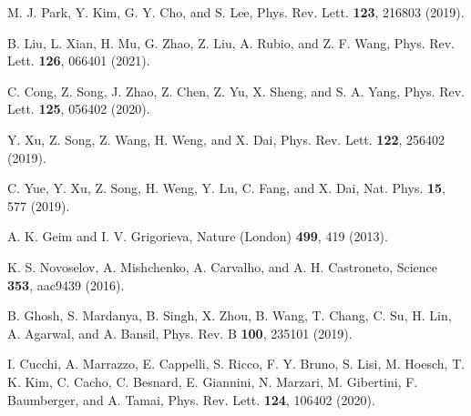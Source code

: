 \documentclass[aps,prl,twocolumn,showpacs,superscriptaddress]{revtex4-1}
\begin{document}
\begin{thebibliography}{99}
M. J. Park, Y. Kim, G. Y. Cho, and S. Lee, Phys. Rev. Lett. \textbf{123}, 216803 (2019).

B. Liu, L. Xian, H. Mu, G. Zhao, Z. Liu, A. Rubio, and Z. F. Wang, Phys. Rev. Lett. \textbf{126}, 066401 (2021).

C. Cong, Z. Song, J. Zhao, Z. Chen, Z. Yu, X. Sheng, and S. A. Yang, Phys. Rev. Lett. \textbf{125}, 056402 (2020).

Y. Xu, Z. Song, Z. Wang, H. Weng, and X. Dai, Phys. Rev. Lett. \textbf{122}, 256402 (2019).

C. Yue, Y. Xu, Z. Song, H. Weng, Y. Lu, C. Fang, and X. Dai, Nat. Phys. \textbf{15}, 577 (2019).

A. K. Geim and I. V. Grigorieva, Nature (London) \textbf{499}, 419 (2013).

K. S. Novoselov, A. Mishchenko, A. Carvalho, and A. H. Castroneto, Science \textbf{353}, aac9439 (2016).







B. Ghosh, S. Mardanya, B. Singh, X. Zhou, B. Wang, T. Chang, C. Su, H. Lin, A. Agarwal, and A. Bansil, Phys. Rev. B \textbf{100}, 235101 (2019).

I. Cucchi, A. Marrazzo, E. Cappelli, S. Ricco, F. Y. Bruno, S. Lisi, M. Hoesch, T. K. Kim, C. Cacho, C. Besnard, E. Giannini, N. Marzari, M. Gibertini, F. Baumberger, and A. Tamai, Phys. Rev. Lett. \textbf{124}, 106402 (2020).


\end{thebibliography}
\end{document}
